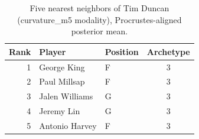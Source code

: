 \begin{table}[htbp]
  \centering\small
  \begin{tabular}{rllc}
    \toprule
    Rank & Player & Position & Archetype \\
    \midrule
    1 & George King & F & 3 \\
    2 & Paul Millsap & F & 3 \\
    3 & Jalen Williams & G & 3 \\
    4 & Jeremy Lin & G & 3 \\
    5 & Antonio Harvey & F & 3 \\
    \bottomrule
  \end{tabular}
  \caption{Five nearest neighbors of Tim Duncan (curvature_m5 modality), Procrustes-aligned posterior mean.}
  \label{tab:Tim_Duncan_neighbors_curvature_m5}
\end{table}

